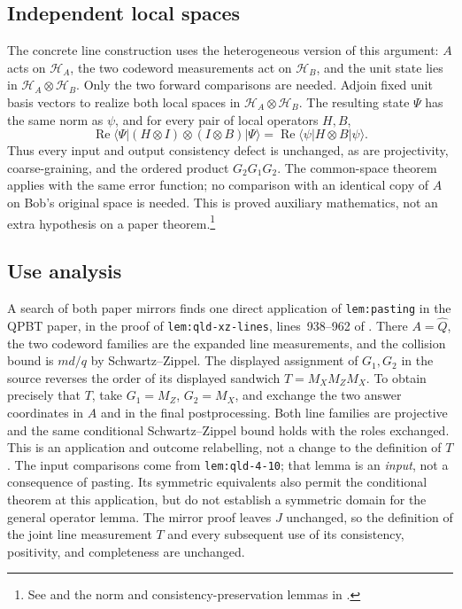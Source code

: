 \documentclass[11pt]{article}
\begin{document}
\subsection*{Independent local spaces}

The concrete line construction uses the heterogeneous version of this
argument: $A$ acts on $\mathcal H_A$, the two codeword measurements act on
$\mathcal H_B$, and the unit state lies in
$\mathcal H_A\otimes\mathcal H_B$. Only the two forward comparisons are
needed. Adjoin fixed unit basis vectors to realize both local spaces in
$\mathcal H_A\otimes\mathcal H_B$. The resulting state $\Psi$ has the
same norm as $\psi$, and for every pair of local operators $H,B$,
\[
 \operatorname{Re}\langle\Psi| (H\otimes I)\otimes(I\otimes B)|\Psi\rangle
   =\operatorname{Re}\langle\psi|H\otimes B|\psi\rangle.
\]
Thus every input and output consistency defect is unchanged, as are
projectivity, coarse-graining, and the ordered product $G_2G_1G_2$.
The common-space theorem applies with the same error function; no comparison
with an identical copy of $A$ on Bob's original space is needed. This is
proved auxiliary mathematics, not an extra hypothesis on a paper
theorem.\footnote{See  and the
norm and consistency-preservation lemmas in
.}

\subsection*{Use analysis}

A search of both paper mirrors finds one direct application of
\texttt{lem:pasting} in the QPBT paper, in the proof of
\texttt{lem:qld-xz-lines}, lines~938--962 of
.
There $A=\hat Q$, the two codeword families are the expanded line
measurements, and the collision bound is $md/q$ by Schwartz--Zippel.
The displayed assignment of $G_1,G_2$ in the source reverses the order of its
displayed sandwich $T=M_XM_ZM_X$. To obtain precisely that $T$, take $G_1=M_Z$,
$G_2=M_X$, and exchange the two answer coordinates in $A$ and in the final
postprocessing. Both line families are projective and the same conditional
Schwartz--Zippel bound holds with the roles exchanged. This is an application
and outcome relabelling, not a change to the definition of $T$.
The input comparisons come from \texttt{lem:qld-4-10}; that lemma is an
\emph{input}, not a consequence of pasting. Its symmetric equivalents also
permit the conditional theorem at this application, but do not establish a
symmetric domain for the general operator lemma. The mirror proof leaves
$J$ unchanged, so the definition of the joint line measurement $T$ and every
subsequent use of its consistency, positivity, and completeness are unchanged.
\end{document}
